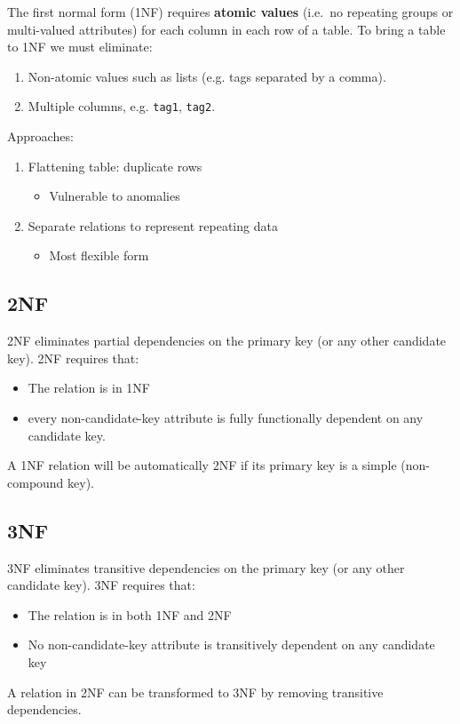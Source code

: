 \documentclass[slides]{pgnotes}
\begin{document}
The first normal form (1NF) requires \textbf{atomic values} (i.e.~no repeating
groups or multi-valued attributes) for each column in each row of a table.
To bring a table to 1NF we must eliminate:
\begin{enumerate}
\item Non-atomic values such as lists (e.g. tags separated by a comma).
\item Multiple columns, e.g. \texttt{tag1}, \texttt{tag2}.
\end{enumerate}
Approaches:
\begin{enumerate}
\item
  Flattening table: duplicate rows
  \begin{itemize}
  \item
    Vulnerable to anomalies
  \end{itemize}
\item
  Separate relations to represent repeating data
  \begin{itemize}  
  \item
    Most flexible form
  \end{itemize}
\end{enumerate}

\subsection{2NF}\label{nf-1}

2NF eliminates partial dependencies on the primary key (or any other candidate key).  
2NF requires that:

\begin{itemize}
\item
  The relation is in 1NF
\item
  every non-candidate-key attribute is fully functionally dependent on
  any candidate key.
\end{itemize}

A 1NF relation will be automatically 2NF if its primary key is a simple
(non-compound key).

\subsection{3NF}\label{nf-2}

3NF eliminates transitive dependencies on the primary key (or any other candidate key).
3NF requires that:

\begin{itemize}
\item
  The relation is in both 1NF and 2NF
\item
  No non-candidate-key attribute is transitively dependent on any
  candidate key
\end{itemize}

A relation in 2NF can be transformed to 3NF by removing transitive
dependencies.



\end{document}

